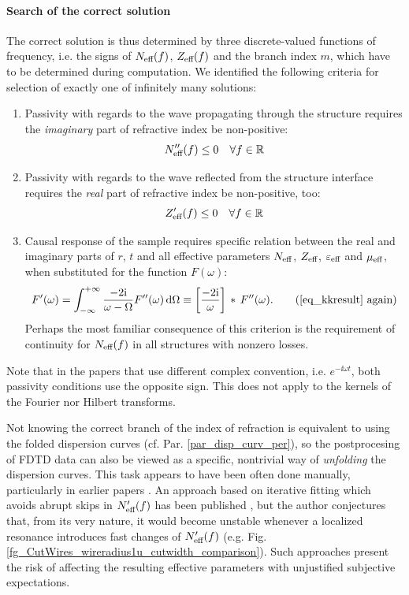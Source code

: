 \paragraph{Search of the correct solution} %
The correct solution is thus determined by three discrete-valued functions of frequency, i.e. the signs of $N_{\text{eff} }(f)$, $Z_{\text{eff} }(f)$ and the branch index $m$, which have to be determined during computation. 
We identified the following criteria for selection of exactly one of infinitely many solutions:
\begin{enumerate}
	\item{Passivity with regards to the wave propagating through the structure requires the \textit{imaginary} part of refractive index be non-positive: 
		 \begin{equation} N_{\text{eff} }''(f) \leq 0 \quad \forall f\in \mathbb{R} \label{eq_Neff_pass}\end{equation}
		 } 
	 \item{Passivity with regards to the wave reflected from the structure interface requires the \textit{real} part of refractive index be non-positive, too: 
		 \begin{equation} Z_{\text{eff} }'(f) \leq 0 \quad \forall f\in \mathbb{R} \label{eq_Zeff_pass}\end{equation}
		 } 
	 \item{Causal response of the sample requires specific relation between the real and imaginary parts of $r$, $t$ and all effective parameters $N_{\text{eff} }$, $Z_{\text{eff} }$, $\varepsilon_{\text{eff} }$ and $\mu_{\text{eff} }$, when substituted for the function $F(\omega)$:
		 \begin{equation} 
F'(\omega) = \int_{-\infty}^{+\infty}  \frac{-2\ii}{\omega - \Omega} F''(\omega) \,\mbox{d}\Omega  \equiv  \left[\frac{-2\ii}{\omega}\right]\,\ast\,F''(\omega). \tag{\ref{eq_kkresult} \again}\end{equation} 
Perhaps the most familiar consequence of this criterion is the requirement of continuity for $N_{\text{eff} }(f)$ in all structures with nonzero losses.
		 } 
\end{enumerate}
Note that in the papers that use different complex convention, i.e. $e^{-\ii\omega t}$, both passivity conditions use the opposite sign. This does not apply to the kernels of the Fourier nor Hilbert transforms.

Not knowing the correct branch of the index of refraction is equivalent to using the folded dispersion curves (cf. Par. \ref{par_disp_curv_per}), %
so the postprocesing of FDTD data can also be viewed as a specific, nontrivial way of \textit{unfolding} the dispersion curves. This task appears to have been often done manually, particularly in earlier papers \cite{smith2002determination}. An approach based on iterative fitting which avoids abrupt skips in $N_{\text{eff} }'(f)$ has been published \cite{chen2004robust}, but the author conjectures that, from its very nature, it would become unstable whenever a localized resonance introduces fast changes of $N_{\text{eff} }'(f)$ (e.g. Fig. \ref{fg_CutWires_wireradius1u_cutwidth_comparison}). Such approaches present the risk of affecting the resulting effective parameters with unjustified subjective expectations.

